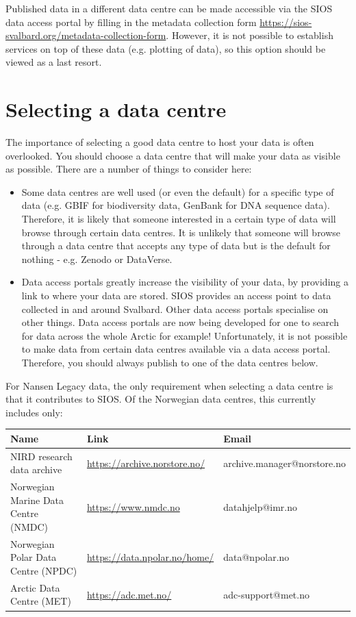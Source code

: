 \documentclass[a4paper,english, 11pt]{article}
\begin{document}
Published data in a different data centre can be made accessible via the SIOS data access portal by filling in the metadata collection form \url{https://sios-svalbard.org/metadata-collection-form}. However, it is not possible to establish services on top of these data (e.g. plotting of data), so this option should be viewed as a last resort.

\newpage
\section{Selecting a data centre}
\label{s:datacentre}

The importance of selecting a good data centre to host your data is often overlooked. You should choose a data centre that will make your data as visible as possible. There are a number of things to consider here:

\begin{itemize}
\item Some data centres are well used (or even the default) for a specific type of data (e.g. GBIF for biodiversity data, GenBank for DNA sequence data). Therefore, it is likely that someone interested in a certain type of data will browse through certain data centres. It is unlikely that someone will browse through a data centre that accepts any type of data but is the default for nothing - e.g. Zenodo or DataVerse.
\item Data access portals greatly increase the visibility of your data, by providing a link to where your data are stored. SIOS provides an access point to data collected in and around Svalbard. Other data access portals specialise on other things. Data access portals are now being developed for one to search for data across the whole Arctic for example! Unfortunately, it is not possible to make data from certain data centres available via a data access portal. Therefore, you should always publish to one of the data centres below.
\end{itemize}

For Nansen Legacy data, the only requirement when selecting a data centre is that it contributes to SIOS. Of the Norwegian data centres, this currently includes only: 

\begin{center}
\begin{tabular}{ |p{}|p{}|p{}|} 
\hline
Name & Link & Email  \\
\hline
NIRD research data archive & \url{https://archive.norstore.no/} & archive.manager@norstore.no \\  
\hline
Norwegian Marine Data Centre (NMDC) & \url{https://www.nmdc.no} & datahjelp@imr.no \\   
\hline
Norwegian Polar Data Centre (NPDC) & \url{https://data.npolar.no/home/} & data@npolar.no \\     
\hline
Arctic Data Centre (MET) & \url{https://adc.met.no/} & adc-support@met.no \\   
\hline
\end{tabular}
\end{center}
\end{document}
